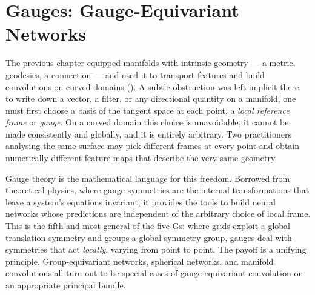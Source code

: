 \providecommand{\Ad}{\operatorname{Ad}}
\providecommand{\Hol}{\operatorname{Hol}}
\providecommand{\GL}{\operatorname{GL}}
\providecommand{\SO}{\operatorname{SO}}
\providecommand{\SU}{\operatorname{SU}}
\providecommand{\Ut}{\operatorname{U}}
\providecommand{\Ot}{\operatorname{O}}
\providecommand{\Mani}{\mathcal{M}}
\providecommand{\Lie}[1]{\mathfrak{#1}}
\providecommand{\Cl}{\operatorname{Cl}}
\providecommand{\Stab}{\operatorname{Stab}}
\providecommand{\Img}{\operatorname{Im}}
\providecommand{\rank}{\operatorname{rank}}
\providecommand{\dR}{\mathrm{dR}}
\providecommand{\softmax}{\operatorname{softmax}}

\chapter{Gauges: Gauge-Equivariant Networks}
\label{ch:gauges}

The previous chapter equipped manifolds with intrinsic geometry --- a metric,
geodesics, a connection --- and used it to transport features and build
convolutions on curved domains (). A subtle obstruction was
left implicit there: to write down a vector, a filter, or any directional
quantity on a manifold, one must first choose a basis of the tangent space at
each point, a \emph{local reference frame} or \emph{gauge}. On a curved domain
this choice is unavoidable, it cannot be made consistently and globally, and it
is entirely arbitrary. Two practitioners analysing the same surface may pick
different frames at every point and obtain numerically different feature maps
that describe the very same geometry.

Gauge theory is the mathematical language for this freedom. Borrowed from
theoretical physics, where gauge symmetries are the internal transformations
that leave a system's equations invariant, it provides the tools to build neural
networks whose predictions are independent of the arbitrary choice of local
frame. This is the fifth and most general of the five Gs: where grids exploit a
global translation symmetry and groups a global symmetry group, gauges deal with
symmetries that act \emph{locally}, varying from point to point. The payoff is a
unifying principle. Group-equivariant networks, spherical networks, and
manifold convolutions all turn out to be special cases of gauge-equivariant
convolution on an appropriate principal bundle.

